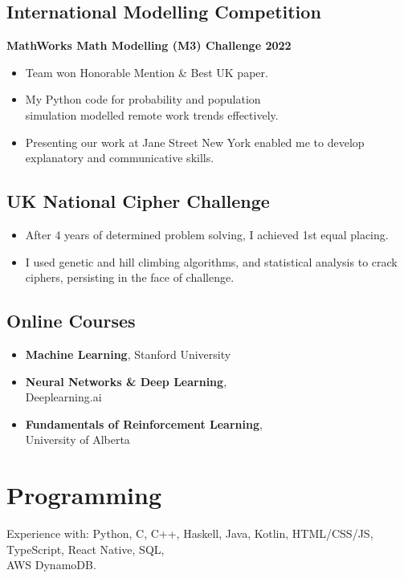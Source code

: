 \documentclass{Resume}
\begin{document}
		\subsection{International Modelling Competition}
			\textbf{MathWorks Math Modelling (M3) Challenge 2022} 
			\begin{itemize}
			    \item Team won Honorable Mention \& Best UK paper.
			    \item My Python code for probability and population \\ simulation modelled remote work trends effectively.
			    \item Presenting our work at Jane Street New York enabled me to develop explanatory and communicative skills.
			\end{itemize}

            \subsection{UK National Cipher Challenge}
		  \begin{itemize}
                \item After 4 years of determined problem solving, I achieved 1st equal placing.
                \item I used genetic and hill climbing algorithms, and statistical analysis to crack ciphers, persisting in the face of challenge.
            \end{itemize}
   			
		\subsection{Online Courses}
			\begin{itemize}[itemsep=1mm, parsep=0pt]
				\item \textbf{Machine Learning}, Stanford University
				\item \textbf{Neural Networks \& Deep Learning}, \\ Deeplearning.ai 
				\item \textbf{Fundamentals of Reinforcement Learning}, \\ University of Alberta
			\end{itemize}


		\newpage
	\section{Programming}
			Experience with: Python, C, C++, Haskell, Java, Kotlin, HTML/CSS/JS, TypeScript, React Native, SQL, \\AWS DynamoDB.
   
\end{document}
